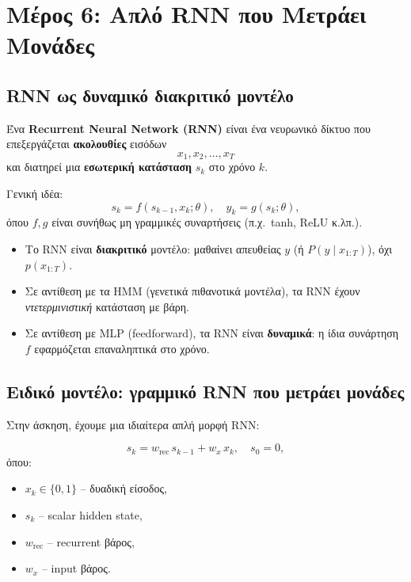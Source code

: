 \documentclass[a4paper,11pt]{article}
\begin{document}
\clearpage

\section{Μέρος 6: Απλό RNN που Μετράει Μονάδες}

\subsection{RNN ως δυναμικό διακριτικό μοντέλο}

Ένα \textbf{Recurrent Neural Network (RNN)} είναι ένα νευρωνικό δίκτυο
που επεξεργάζεται \textbf{ακολουθίες} εισόδων
\[
x_1,x_2,\dots,x_T
\]
και διατηρεί μια \textbf{εσωτερική κατάσταση} $s_k$ στο χρόνο $k$.

Γενική ιδέα:
\[
s_k = f(s_{k-1},x_k;\theta),
\quad
y_k = g(s_k;\theta),
\]
όπου $f,g$ είναι συνήθως μη γραμμικές συναρτήσεις (π.χ.\ tanh, ReLU κ.λπ.).

\begin{itemize}
  \item Το RNN είναι \textbf{διακριτικό} μοντέλο:
        μαθαίνει απευθείας $y$ (ή $P(y\mid x_{1:T})$), όχι $p(x_{1:T})$.
  \item Σε αντίθεση με τα HMM (γενετικά πιθανοτικά μοντέλα), τα RNN
        έχουν \emph{ντετερμινιστική} κατάσταση με βάρη.
  \item Σε αντίθεση με MLP (feedforward), τα RNN είναι \textbf{δυναμικά}:
        η ίδια συνάρτηση $f$ εφαρμόζεται επαναληπτικά στο χρόνο.
\end{itemize}

\subsection{Ειδικό μοντέλο: γραμμικό RNN που μετράει μονάδες}

Στην άσκηση, έχουμε μια ιδιαίτερα απλή μορφή RNN:

\[
s_k = w_{\mathrm{rec}}\, s_{k-1} + w_x\, x_k,\quad s_0=0,
\]
όπου:
\begin{itemize}
  \item $x_k \in \{0,1\}$ – δυαδική είσοδος,
  \item $s_k$ – scalar hidden state,
  \item $w_{\mathrm{rec}}$ – recurrent βάρος,
  \item $w_x$ – input βάρος.
\end{itemize}
\end{document}
